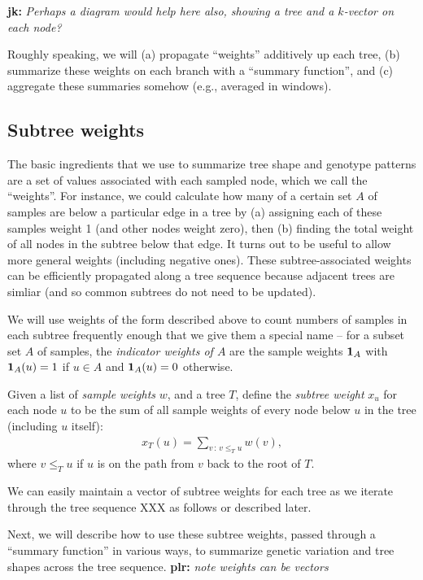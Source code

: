 \documentclass{article}
\newcommand{\iw}{w} %
\newcommand{\nw}{x} %
\newcommand{\plr}[1]{{\color{blue}\textbf{plr:} \it #1}}
\newcommand{\jk}[1]{{\color{red}\textbf{jk:} \it #1}}
\begin{document}
\jk{Perhaps a diagram would help here also, showing a tree and a $k$-vector on each
node?}

Roughly speaking, we will 
(a) propagate ``weights'' additively up each tree,
(b) summarize these weights on each branch with a ``summary function'',
and (c) aggregate these summaries somehow
(e.g., averaged in windows).


\subsection*{Subtree weights}

The basic ingredients that we use to summarize tree shape and genotype patterns
are a set of values associated with each sampled node, which we call the ``weights''.
For instance, we could calculate how many of a certain set $A$ of samples 
are below a particular edge in a tree
by (a) assigning each of these samples weight 1 (and other nodes weight zero), then
(b) finding the total weight of all nodes in the subtree below that edge.
It turns out to be useful to allow more general weights (including negative ones).
These subtree-associated weights can be efficiently propagated along a tree sequence
because adjacent trees are simliar (and so common subtrees do not need to be updated).

We will use weights of the form described above to count numbers of samples in each subtree
frequently enough that we give them a special name --
for a subset set $A$ of samples,
the \emph{indicator weights of $A$} are the sample weights $\mathbf{1}_A$ with
$\mathbf{1}_A(u) = 1$ if $u \in A$ and $\mathbf{1}_A(u) = 0$ otherwise.

\begin{definition}
    Given a list of \emph{sample weights} $w$, and a tree $T$,
    define the \emph{subtree weight} $x_u$ for each node $u$ to be the sum of all sample weights
    of every node below $u$ in the tree (including $u$ itself):
    \begin{align*}
        \nw_T(u) = \sum_{v \,:\, v \le_T u} \iw(v) ,
    \end{align*}
    where $v \le_T u$ if $u$ is on the path from $v$ back to the root of $T$.
\end{definition}

We can easily maintain a vector of subtree weights for each tree
as we iterate through the tree sequence
XXX as follows or described later.

Next, we will describe how to use these subtree weights,
passed through a ``summary function'' in various ways,
to summarize genetic variation and tree shapes across the tree sequence.
\plr{note weights can be vectors}
\end{document}
